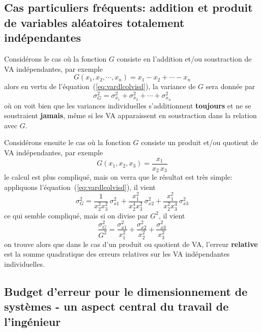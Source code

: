 \documentclass[main.tex]{subfiles}
\begin{document}
\subsection{Cas particuliers fréquents: addition et produit de variables aléatoires totalement indépendantes}

Considérons le cas où la fonction $G$ consiste en l'addition et/ou soustraction de VA indépendantes, par exemple
\begin{equation}
    G(x_1,x_2,\cdots,x_n)=x_1-x_2+\cdots-x_n
\end{equation}
alors en vertu de l'équation~(\ref{eq:vardlcolvisd}), la variance de $G$ sera donnée par
\begin{equation}
    \sigma^2_G=\sigma_{x_1}^2+\sigma_{x_2}^2+\cdots+\sigma_{x_n}^2
\end{equation}
où on voit bien que les variances individuelles s'additionnent \textbf{toujours} et ne se soustraient \textbf{jamais}, même si les VA apparaissent en soustraction dans la relation avec $G$.

Considérons ensuite le cas où la fonction $G$ consiste un produit et/ou quotient de VA indépendantes, par exemple
\begin{equation}
    G(x_1,x_2,x_3)=\frac{x_1}{x_2\,x_3}
\end{equation}
le calcul est plus compliqué, mais on verra que le résultat est très simple: appliquons l'équation~(\ref{eq:vardlcolvisd}), il vient
\begin{equation}
    \sigma^2_G=
    \frac{1}{x_2^2x_3^2}\,\sigma_{x1}^2+
    \frac{x_1^2}{x_2^4x_3^2}\,\sigma_{x2}^2+
    \frac{x_1^2}{x_2^2x_3^4}\,\sigma_{x3}^2
\end{equation}
ce qui semble compliqué, mais si on divise par $G^2$, il vient
\begin{equation}
    \frac{\sigma^2_G}{G^2}=
    \frac{\sigma_{x1}^2}{x_1^2}+
    \frac{\sigma_{x2}^2}{x_2^2}+
    \frac{\sigma_{x3}^2}{x_3^2}
\end{equation}
on trouve alors que dans le cas d'un produit ou quotient de VA, l'erreur \textbf{relative} est la somme quadratique des erreurs relatives sur les VA indépendantes individuelles.

\subsection{Budget d'erreur pour le dimensionnement de systèmes - un aspect central du travail de l'ingénieur}
\end{document}

